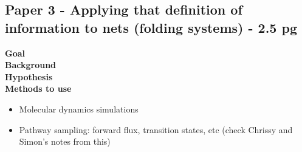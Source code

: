 \subsection{Paper 3 - Applying that definition of information to nets (folding systems) - 2.5 pg}


\textbf{Goal} \\

\textbf{Background} \\

\textbf{Hypothesis} \\

\textbf{Methods to use} \\

\begin{itemize}
\item Molecular dynamics simulations
\item Pathway sampling: forward flux, transition states, etc (check Chrissy and Simon's notes from this)
\end{itemize}

